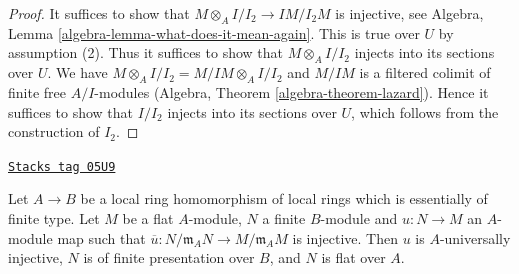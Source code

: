 \begin{proof}
It suffices to show that
$M \otimes_A I/I_2 \to IM/I_2M$ is injective, see
Algebra, Lemma \ref{algebra-lemma-what-does-it-mean-again}.
This is true over $U$ by assumption (2). Thus it suffices to show
that $M \otimes_A I/I_2$ injects into its sections over $U$.
We have $M \otimes_A I/I_2 = M/IM \otimes_A I/I_2$ and
$M/IM$ is a filtered colimit of finite free $A/I$-modules
(Algebra, Theorem \ref{algebra-theorem-lazard}).
Hence it suffices to show that $I/I_2$ injects into its sections
over $U$, which follows from the construction of $I_2$.
\end{proof}

\begin{proposition}
\label{flat-proposition-finite-type-injective-into-flat-mod-m}
\href{https://stacks.math.columbia.edu/tag/05U9}{\texttt{Stacks tag 05U9}}

Let $A \to B$ be a local ring homomorphism of local rings
which is essentially of finite type. Let $M$ be a flat $A$-module,
$N$ a finite $B$-module and $u : N \to M$ an $A$-module map such that
$\overline{u} : N/\mathfrak m_AN \to M/\mathfrak m_AM$ is injective.
Then $u$ is $A$-universally injective, $N$ is of finite presentation over
$B$, and $N$ is flat over $A$.
\end{proposition}

